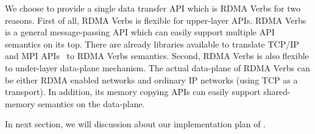We choose to provide a single data transfer API which is RDMA Verbs for two
reasons. First of all, RDMA Verbs is flexible for upper-layer APIs.
RDMA Verbs is a general message-passing API which can 
easily support multiple API semantics on its top. There are already libraries
available to translate TCP/IP~\cite{rfc7609,rsockets,sdp} and MPI APIs~ \cite{mpi-rdma} to RDMA Verbs 
semantics. 
Second, RDMA Verbs is also flexible to under-layer data-plane mechanism. 
The actual data-plane of RDMA Verbs can be either RDMA enabled networks and 
ordinary IP networks (using TCP as a transport). 
In addition, its memory copying APIs can 
easily support shared-memory semantics on the data-plane. 

In next section, we will discussion about our implementation plan of \sysname.





